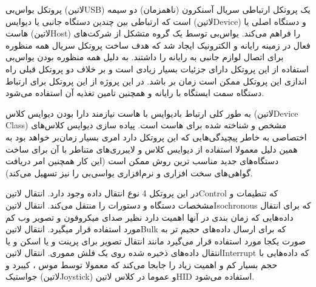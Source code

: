 
پروتکل یو‌اس‌بی (‌لاتین{USB}) یک پروتکل ارتباطی سریال آسنکرون (نا‌همزمان) دو سیمه است که ارتباطی بین چندین دستگاه‌ جانبی یا دیوایس (‌لاتین{Device}) و دستگاه اصلی یا هاست (‌لاتین{Host}) را فراهم می‌کند. یواس‌بی توسط یک گروه متشکل از شرکت‌های فعال در زمینه رایانه و الکترونیک ایجاد شد که هدف ساخت پروتکل سریال همه منظوره برای اتصال لوازم جانبی به رایانه را داشتند. به دلیل همه منظوره بودن یو‌اس‌بی استفاده از این پروتکل دارای جزئیات بسیار زیادی است و بر خلاف دو پروتکل قبلی راه اندازی این پروتکل ممکن است زمان بر باشد. در این پروژه از این پروتکل برای ارتباط دستگاه سمت ایستگاه با رایانه و همچنین تامین تغذیه آن استفاده می‌شود.

به طور کلی ارتباط بادیوایس با هاست نیازمند دارا بودن دیوایس کلاس (‌لاتین{Device Class}) مشخص و شناخته شده‌ برای هاست است. پیاده سازی دیوایس کلاس‌های اختصاصی به خاطر پیچیدگی‌هایی که این پروتکل دارد امری بسیار زمان‌بر خواهد بود به همین دلیل معمولا استفاده از دیوایس کلاس‌ و لایبرری‌های متناطر با آن برای ساخت دستگاه‌های جدید مناسب ترین روش ممکن است (این کار همچنین امر دریافت گواهی‌های سخت افزاری و نرم‌افزاری یو‌اسی‌بی را نیز تسهیل می‌کند).

در این پروتکل 4 نوع انتقال داده وجود دارد. انتقال ‌لاتین{Control} که تنطیمات و مشخصات دستگاه و دستورات را منتقل می‌کند. انتقال ‌لاتین{Isochronous} که برای انتقال داد‌ه‌هایی که زمان بندی در آنها اهمیت دارد نظیر صدای میکروفون و تصویر وب کم مورد استفاده قرار میگیرد. انتقال ‌لاتین{Bulk} که برای ارسال داده‌های حجیم تر به صورت یکجا مورد استفاده قرار می‌گیرد مانند انتقال تصویر برای پرینت و یا اسکن و یا انتقال داده‌های ذخیره شده روی یک فلش مموری. انتقال ‌لاتین{Interrupt} که داده‌هایی با حجم بسیار کم و اهمیت زیاد را جابجا می‌کند که معمولا توسط موس ، کیبرد و جواستیک (‌لاتین{Joystick}) و عموما در کلاس ‌لاتین{HID} استفاده می‌شود.


